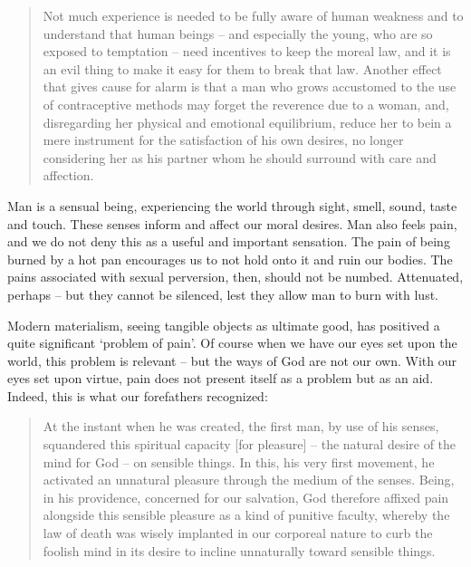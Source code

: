 \documentclass[letterpaper]{article}
\begin{document}
    \begin{quote}
      Not much experience is needed to be fully aware of human weakness and to understand that human beings -- and especially the young, who are so exposed to temptation -- need incentives to keep the moreal law, and it is an evil thing to make it easy for them to break that law. Another effect that gives cause for alarm is that a man who grows accustomed to the use of contraceptive methods may forget the reverence due to a woman, and, disregarding her physical and emotional equilibrium, reduce her to bein a mere instrument for the satisfaction of his own desires, no longer considering her as his partner whom he should surround with care and affection.
    \end{quote}

    Man is a sensual being, experiencing the world through sight, smell, sound, taste and touch. These senses inform and affect our moral desires. Man also feels pain, and we do not deny this as a useful and important sensation. The pain of being burned by a hot pan encourages us to not hold onto it and ruin our bodies. The pains associated with sexual perversion, then, should not be numbed. Attenuated, perhaps -- but they cannot be silenced, lest they allow man to burn with lust.

    Modern materialism, seeing tangible objects as ultimate good, has positived a quite significant `problem of pain'. Of course when we have our eyes set upon the world, this problem is relevant -- but the ways of God are not our own. With our eyes set upon virtue, pain does not present itself as a problem but as an aid. Indeed, this is what our forefathers recognized:

    \begin{quote}
      At the instant when he was created, the first man, by use of his senses, squandered this spiritual capacity [for pleasure] -- the natural desire of the mind for God -- on sensible things. In this, his very first movement, he activated an unnatural pleasure through the medium of the senses. Being, in his providence, concerned for our salvation, God therefore affixed pain alongside this sensible pleasure as a kind of punitive faculty, whereby the law of death was wisely implanted in our corporeal nature to curb the foolish mind in its desire to incline unnaturally toward sensible things.
    \end{quote}
\end{document}

